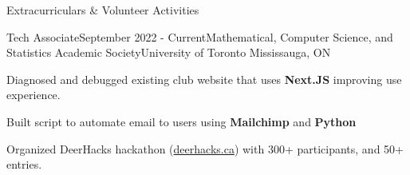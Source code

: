 \documentclass[
	11pt, %
]{resume} %
\begin{document}
\begin{rSection}{Extracurriculars \& Volunteer Activities}

	\begin{rSubsection}{Tech Associate}{September 2022 - Current}{Mathematical, Computer Science, and Statistics Academic Society}{University of Toronto Mississauga, ON}
		\item Diagnosed and debugged existing club website that uses \textbf{Next.JS} improving use experience.
		\item Built script to automate email to users using \textbf{Mailchimp} and \textbf{Python}
		\item Organized DeerHacks hackathon (\href{https://deerhacks.ca}{deerhacks.ca}) with 300+ participants, and 50+ entries.
	\end{rSubsection}

\end{rSection}







\end{document}
